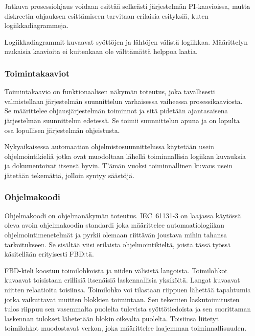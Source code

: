 \documentclass[finnish,12pt]{article}
\begin{document}
Jatkuva prosessiohjaus voidaan esittää selkeästi järjestelmän PI-kaavioissa, mutta diskreetin ohjauksen esittämiseen tarvitaan erilaisia esityksiä, kuten logiikkadiagrammeja. \cite{RefWorks:54}

Logiikkadiagrammit kuvaavat syöttöjen ja lähtöjen välistä logiikkaa.
Määrittelyn mukaisia kaavioita ei kuitenkaan ole välttämättä helppoa laatia.

		\subsubsection{Toimintakaaviot}

Toimintakaavio on funktionaalisen näkymän toteutus, joka tavallisesti valmistellaan järjestelmän suunnittelun varhaisessa vaiheessa prosessikaaviosta.
Se määrittelee ohjausjärjestelmän toiminnot ja sitä pidetään ajantasaisena järjestelmän suunnittelun edetessä.
Se toimii suunnittelun apuna ja on lopulta osa lopullisen järjestelmän ohjeistusta.

Nykyaikaisessa automaation ohjelmistosuunnittelussa käytetään usein ohjelmointikieliä jotka ovat muodoltaan lähellä toiminnallisia logiikan kuvauksia ja dokumentoivat itsensä hyvin.
T'ämän vuoksi toiminnallinen kuvaus usein jätetään tekemättä, jolloin syntyy säästöjä. \cite{RefWorks:41}

		\subsubsection{Ohjelmakoodi}

Ohjelmakoodi on ohjelmanäkymän toteutus.
IEC~61131-3 on laajassa käytössä oleva avoin ohjelmakoodin standardi joka määrittelee automaatiologiikan ohjelmointimenetelmät ja pyrkii olemaan riittävän joustava mihin tahansa tarkoitukseen. \cite{RefWorks:62}
Se sisältää viisi erilaista ohjelmointikieltä, joista tässä työssä käsitellään erityisesti FBD:tä.

FBD-kieli koostuu toimilohkoista ja niiden välisistä langoista.
Toimilohkot kuvaavat toisistaan erillisiä itsenäisiä laskennallisia yksiköitä.
Langat kuvaavat niitten relaatioita toisiinsa.
Toimilohko voi tilastaan riippuen lähettää tapahtumia jotka vaikuttavat muitten blokkien toimintaan.
Sen tekemien laskutoimitusten tulos riippuu sen vasemmalta puolelta tulevista syöttötiedoista ja sen suorittaman laskennan tulokset lähetetään blokin oikealta puolelta.
Toisiinsa liitetyt toimilohkot muodostavat verkon, joka määrittelee laajemman toiminnallisuuden. \cite{RefWorks:55}
\end{document}
